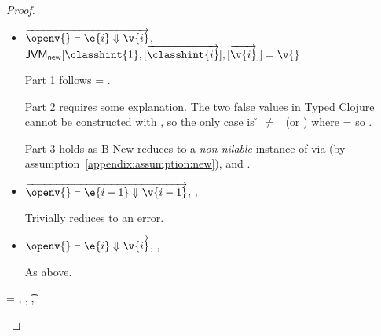 \begin{lemma}
\begin{proof}
\begin{case}[T-NewStatic]
\begin{itemize}
  \item[]
\begin{subcase}[B-New]
  $
  \overrightarrow{
  \opsem {\openv{}}
         {\e{i}}
         {\v{i}}
       }$,
         $\newjava {\classhint{1}}
                  {\overrightarrow{\classhint{i}}}
                  {\overrightarrow{\v{i}}}
                  {\v{}}$

Part 1 follows \object{} = \emptyobject{}.

Part 2 requires some explanation. The two false values in Typed Clojure
cannot be constructed with \newliteral, so the only case is \v{} $\not=$ \false\ (or \nil)
where \thenprop{\prop{}} = \topprop{} so \satisfies{\openv{}}{\thenprop{\prop{}}}.

Part 3 holds as B-New reduces to a \emph{non-nilable}
instance of \class{} via \newjavaliteral (by assumption~\ref{appendix:assumption:new}), and \javatotc{\classhint{}}{\t{}}.

\end{subcase}
  \item[]

\begin{subcase}[BE-New1] $\overrightarrow{
  \opsem {\openv{}}
         {\e{i-1}}
         {\v{i-1}}
       }$,
  \opsem {\openv{}}
         {}
         {\errorvalv{}},
  \opsem {\openv{}} {\e{}} {\errorvalv{}}

        Trivially reduces to an error.

\end{subcase}
  \item[]

\begin{subcase}[BE-New2] 
  $\overrightarrow{
  \opsem {\openv{}}
         {\e{i}}
         {\v{i}}
       }$,
                  {}
                  {}
                  {\errorvalv{}},
        \opsem {\openv{}} {\e{}} {\errorvalv{}}

        As above.

\end{subcase}
\end{itemize}
\end{case}

\begin{case}[T-FieldStatic]
  \e{} = { {} {\fld{}} {}},
   {\class{}},
   {\t{}},
  \judgementtwo {\propenv{}} { {\class{}}}


\end{case}
\end{proof}
\end{lemma}
